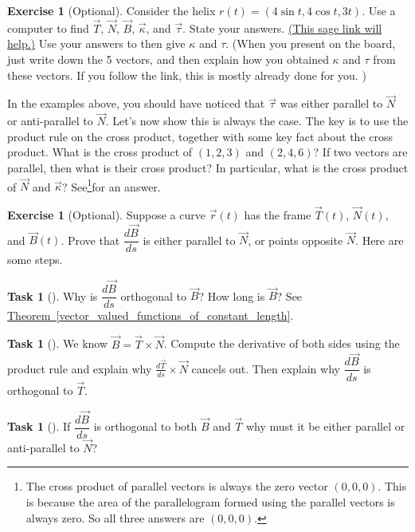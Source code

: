 \documentclass[10pt,]{book}
\theoremstyle{plain}
\theoremstyle{definition}
\theoremstyle{definition}
\theoremstyle{definition}
\theoremstyle{definition}
\newtheorem{exploration}[project]{Exercise}
\newtheorem{task}[project]{Task}
\theoremstyle{definition}
\numberwithin{equation}{section}
\newcommand{\sageurlforcurvature}{http://bmw.byuimath.com/dokuwiki/doku.php?id=curvature_calculator}
\begin{document}
\begin{exploration}[Optional]\label{exploration-188}
Consider the helix \(r(t)=(4\sin t, 4\cos t, 3t)\). Use a computer to find \(\vec T\), \(\vec N\), \(\vec B\), \(\vec \kappa\), and \(\vec \tau\). State your answers. \href{\\sageurlforcurvature}{(This sage link will help.)} Use your answers to then give \(\kappa\) and \(\tau\). (When you present on the board, just write down the 5 vectors, and then explain how you obtained \(\kappa\) and \(\tau\) from these vectors. If you follow the link, this is mostly already done for you. )%
\end{exploration}
In the examples above, you should have noticed that \(\vec \tau\) was either parallel to \(\vec N\) or anti-parallel to \(\vec N\). Let's now show this is always the case. The key is to use the product rule on the cross product, together with some key fact about the cross product.%
What is the cross product of \((1,2,3)\) and \((2,4,6)\)? If two vectors are parallel, then what is their cross product? In particular, what is the cross product of \(\vec N\) and \(\vec \kappa\)? See\footnote{The cross product of parallel vectors is always the zero vector \((0,0,0)\). This is because the area of the parallelogram formed using the parallel vectors is always zero. So all three answers are \((0,0,0)\).\label{fn-16}}for an answer.%
\begin{exploration}[Optional]\label{exploration-189}
Suppose a curve \(\vec r(t)\) has the frame \(\vec T(t)\), \(\vec N(t)\), and \(\vec B(t)\). Prove that \(\dfrac{d\vec B}{ds}\) is either parallel to \(\vec N\), or points opposite \(\vec N\). Here are some steps. \leavevmode%
\begin{itemize}[label=\textbullet]
\begin{task}[]\label{task-461}
Why is \(\dfrac{d\vec B}{ds}\) orthogonal to \(\vec B\)? How long is \(\vec B\)? See \hyperref[vector_valued_functions_of_constant_length]{Theorem~\ref{vector_valued_functions_of_constant_length}}.%
%
\end{task}
\begin{task}[]\label{task-462}
We know \(\vec B=\vec T\times \vec N\). Compute the derivative of both sides using the product rule and explain why \(\frac{d\vec T}{ds}\times \vec N\) cancels out. Then explain why \(\dfrac{d\vec B}{ds}\) is orthogonal to \(\vec T\).%
\end{task}
\begin{task}[]\label{task-463}
If \(\dfrac{d\vec B}{ds}\) is orthogonal to both \(\vec B\) and \(\vec T\) why must it be either parallel or anti-parallel to \(\vec N\)?%
\end{task}
\end{itemize}
%
\end{exploration}
\end{document}
